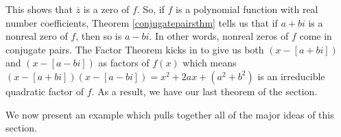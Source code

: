 This shows that $\overline{z}$ is a zero of $f$.  So, if $f$ is a polynomial function with real number coefficients, Theorem \ref{conjugatepairsthm} tells us that if $a+bi$ is a nonreal zero of $f$, then so is $a-bi$.  In other words, nonreal zeros of $f$ come in conjugate pairs.  The Factor Theorem kicks in to give us both $(x-[a+bi])$ and $(x-[a-bi])$ as factors of $f(x)$ which means $(x-[a+bi])(x-[a-bi]) = x^2 + 2a x + \left(a^2+b^2\right)$ is an irreducible quadratic factor of $f$.  As a result, we have our last theorem of the section.

\smallskip


\smallskip

We now present an example which pulls together all of the major ideas of this section.

\medskip


